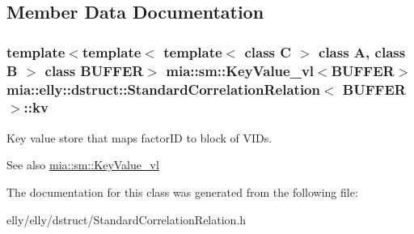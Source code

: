 \subsection{Member Data Documentation}
\hypertarget{classmia_1_1elly_1_1dstruct_1_1_standard_correlation_relation_a2648351b09b9c655802691f8e1c61cfb}{
\subsubsection[{kv}]{\setlength{\rightskip}{0pt plus 5cm}template$<$template$<$ template$<$ class C $>$ class A, class B $>$ class B\-U\-F\-F\-E\-R$>$ {\bf mia\-::sm\-::\-Key\-Value\-\_\-vl}$<$B\-U\-F\-F\-E\-R$>$ {\bf mia\-::elly\-::dstruct\-::\-Standard\-Correlation\-Relation}$<$ B\-U\-F\-F\-E\-R $>$\-::kv}}\label{classmia_1_1elly_1_1dstruct_1_1_standard_correlation_relation_a2648351b09b9c655802691f8e1c61cfb}
Key value store that maps factor\-I\-D to block of V\-I\-Ds.

\begin{DoxySeeAlso}{See also}
\hyperlink{classmia_1_1sm_1_1_key_value__vl}{mia\-::sm\-::\-Key\-Value\-\_\-vl} 
\end{DoxySeeAlso}


The documentation for this class was generated from the following file\-:\begin{DoxyCompactItemize}
\item 
elly/elly/dstruct/Standard\-Correlation\-Relation.\-h\end{DoxyCompactItemize}
